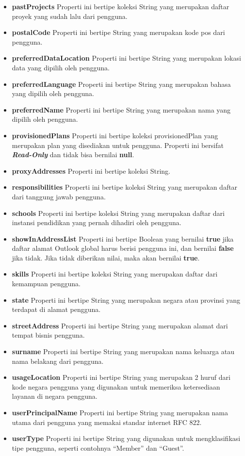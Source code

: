 \begin{itemize}
	\item \textbf{pastProjects}
	Properti ini bertipe koleksi String yang merupakan daftar proyek yang sudah lalu dari pengguna.
	\item \textbf{postalCode}
	Properti ini bertipe String yang merupakan kode pos dari pengguna.
	\item \textbf{preferredDataLocation}
	Properti ini bertipe String yang merupakan lokasi data yang dipilih oleh pengguna.
	 \item \textbf{preferredLanguage}
	Properti ini bertipe String yang merupakan bahasa yang dipilih oleh pengguna.
	\item \textbf{preferredName}
	Properti ini bertipe String yang merupakan nama yang dipilih oleh pengguna.
	\item \textbf{provisionedPlans}
	Properti ini bertipe koleksi provisionedPlan yang merupakan plan yang disediakan untuk pengguna. Properti ini bersifat \textbf{\textit{Read-Only}} dan tidak bisa bernilai \textbf{null}.
	\item \textbf{proxyAddresses}
	Properti ini bertipe koleksi String.
	\item \textbf{responsibilities}
	Properti ini bertipe koleksi String yang merupakan daftar dari tanggung jawab pengguna.
	\item \textbf{schools}
	Properti ini bertipe koleksi String yang merupakan daftar dari instansi pendidikan yang pernah dihadiri oleh pengguna.
	\item \textbf{showInAddressList}
	Properti ini bertipe Boolean yang bernilai \textbf{true} jika daftar alamat Outlook global harus berisi pengguna ini, dan bernilai \textbf{false} jika tidak. Jika tidak diberikan nilai, maka akan bernilai \textbf{true}. 
	\item \textbf{skills}
	Properti ini bertipe koleksi String yang merupakan daftar dari kemampuan pengguna. 
	\item \textbf{state}
	Properti ini bertipe String yang merupakan negara atau provinsi yang terdapat di alamat pengguna. 
	\item \textbf{streetAddress}
	Properti ini bertipe String yang merupakan alamat dari tempat bisnis pengguna.
	\item \textbf{surname}
	Properti ini bertipe String yang merupakan nama keluarga atau nama belakang dari pengguna.  
	\item \textbf{usageLocation}
	Properti ini bertipe String yang merupakan 2 huruf dari kode negara pengguna yang digunakan untuk memeriksa ketersediaan layanan di negara pengguna. 
	\item \textbf{userPrincipalName}
	Properti ini bertipe String yang merupakan nama utama dari pengguna yang memakai standar internet RFC 822.
	\item \textbf{userType}
	Properti ini bertipe String yang digunakan untuk mengklasifikasi tipe pengguna, seperti contohnya ``Member'' dan ``Guest''.	 
\end{itemize}

